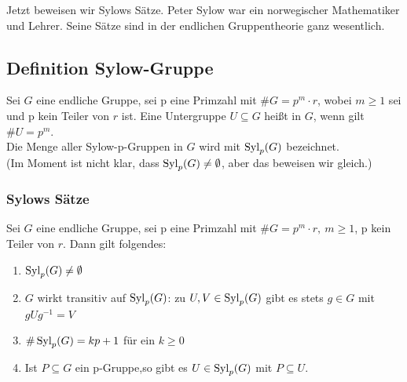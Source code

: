 Jetzt beweisen wir Sylows Sätze. Peter Sylow war ein norwegischer Mathematiker und Lehrer. Seine Sätze sind in der endlichen Gruppentheorie ganz wesentlich.

\subsection{Definition Sylow-Gruppe}
\label{sub:def_sylow_gruppe}
Sei $G$ eine endliche Gruppe, sei p eine Primzahl mit $\#G=p^m\cdot r$, wobei $m\ge 1$ sei und p kein Teiler von $r$ ist. Eine Untergruppe $U\subseteq G$ heißt  in $G$, wenn gilt $\#U=p^m$.\\
Die Menge aller Sylow-p-Gruppen in $G$ wird mit $\operatorname{Syl}_p(G)$ bezeichnet.\\
(Im Moment ist nicht klar, dass $\operatorname{Syl}_p(G)\not=\emptyset$, aber das beweisen wir gleich.)

\subsubsection*{Sylows Sätze}
\label{ssub:sylows_sätze}
Sei $G$ eine endliche Gruppe, sei p eine Primzahl mit $\#G=p^m\cdot r,~m\ge 1$, p kein Teiler von $r$. Dann gilt folgendes:\\
\begin{enumerate}[(1)]
	\item $\operatorname{Syl}_p(G)\not=\emptyset$
	\item $G$ wirkt transitiv auf $\operatorname{Syl}_p(G)$: zu $U,V\in \operatorname{Syl}_p(G)$ gibt es stets $g\in G$ mit $gUg^{-1}=V$
	\item $\#\operatorname{Syl}_p(G)=kp+1$ für ein $k\ge 0$
	\item Ist $P\subseteq G$ ein p-Gruppe,so gibt es $U\in \operatorname{Syl}_p(G)$ mit $P\subseteq U$.
\end{enumerate}






















\cleardoubleoddemptypage
{}
\setcounter{page}{1}




\printindex
\listoffigures
